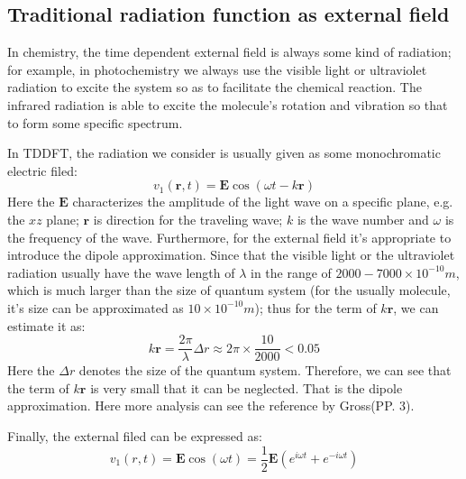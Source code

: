 \subsection{Traditional radiation function as external field}
%
%
In chemistry, the time dependent external field is always some kind
of radiation; for example, in photochemistry we always use the
visible light or ultraviolet radiation to excite the system so as to
facilitate the chemical reaction. The infrared radiation is able to
excite the molecule's rotation and vibration so that to form some
specific spectrum.

In TDDFT, the radiation we consider is usually given as some
monochromatic electric filed:
\begin{equation}\label{}
v_{1}(\mathbf{r}, t) = \mathbf{E}\cos (\omega t - k\mathbf{r})
\end{equation}
Here the $\mathbf{E}$ characterizes the amplitude of the light wave
on a specific plane, e.g. the $xz$ plane; $\mathbf{r}$ is direction
for the traveling wave; $k$ is the wave number and $\omega$ is the
frequency of the wave. Furthermore, for the external field it's
appropriate to introduce the dipole approximation. Since that the
visible light or the ultraviolet radiation usually have the wave
length of $\lambda$ in the range of $2000-7000\times10^{-10}m$,
which is much larger than the size of quantum system (for the
usually molecule, it's size can be approximated as
$10\times10^{-10}m$); thus for the term of $k\mathbf{r}$, we can
estimate it as:
\begin{equation}\label{}
k\mathbf{r}  = \frac{2\pi}{\lambda}\Delta r \approx 2\pi
\times\frac{10}{2000} < 0.05
\end{equation}
Here the $\Delta r$ denotes the size of the quantum system.
Therefore, we can see that the term of $k\mathbf{r}$ is very small
that it can be neglected. That is the dipole approximation. Here
more analysis can see the reference by Gross\cite{Gross1}(PP. 3).

Finally, the external filed can be expressed as:
\begin{equation}\label{TDDFTeq:51}
v_{1}(r,t) = \mathbf{E}\cos (\omega t) = \frac{1}{2}\mathbf{E}
(e^{i\omega t} + e^{-i\omega t})
\end{equation}

